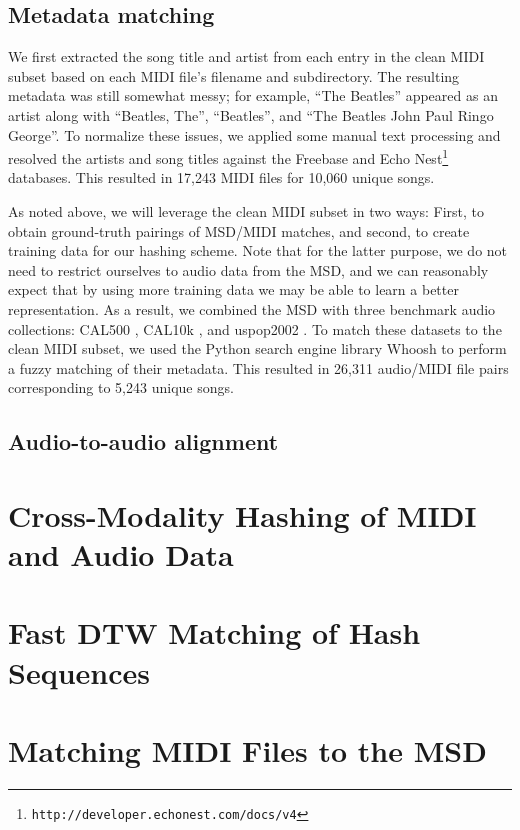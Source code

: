 \documentclass{article}
\begin{document}
\subsection{Metadata matching}

We first extracted the song title and artist from each entry in the clean MIDI subset based on each MIDI file's filename and subdirectory.
The resulting metadata was still somewhat messy; for example, ``The Beatles'' appeared as an artist along with ``Beatles, The'', ``Beatles'', and ``The Beatles John Paul Ringo George''.
To normalize these issues, we applied some manual text processing and resolved the artists and song titles against the Freebase \cite{bollacker2008freebase} and Echo Nest\footnote{\texttt{http://developer.echonest.com/docs/v4}} databases.
This resulted in 17,243 MIDI files for 10,060 unique songs.

As noted above, we will leverage the clean MIDI subset in two ways: First, to obtain ground-truth pairings of MSD/MIDI matches, and second, to create training data for our hashing scheme.
Note that for the latter purpose, we do not need to restrict ourselves to audio data from the MSD, and we can reasonably expect that by using more training data we may be able to learn a better representation.
As a result, we combined the MSD with three benchmark audio collections: CAL500 \cite{turnbull2007towards}, CAL10k \cite{tingle2010exploring}, and uspop2002 \cite{berenzweig2004large}.
To match these datasets to the clean MIDI subset, we used the Python search engine library Whoosh to perform a fuzzy matching of their metadata.
This resulted in 26,311 audio/MIDI file pairs corresponding to 5,243 unique songs.

\subsection{Audio-to-audio alignment}


\section{Cross-Modality Hashing of MIDI and Audio Data}
\label{sec:hashing}

\section{Fast DTW Matching of Hash Sequences}
\label{sec:dtw}

\section{Matching MIDI Files to the MSD}
\label{sec:msd}


\end{document}
